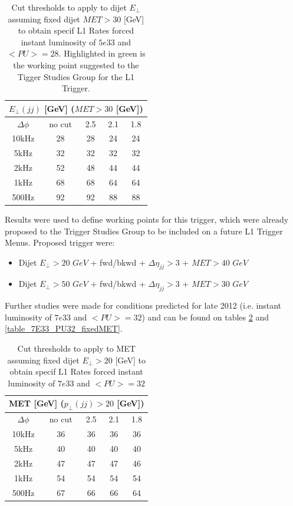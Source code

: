 \documentclass[%
 reprint,
 amsmath,
 amssymb,
 aps,
 pra,
 showkeys
]{revtex4-1}
\begin{document}
\begin{table} 
\begin{tabular}{|c||c|c|c|c|}
\hline
\multicolumn{5}{|c|}{$E_\bot(jj)$ [GeV] ($MET>30$ [GeV])} \\
\hline
$\Delta\phi$ & no cut & 2.5 & 2.1 & 1.8 \\
\hline
10kHz        &     28 &  28 &  24 &  24 \\
5kHz         &     32 &  32 &  32 &  32 \\
\cellcolor{green} 2kHz         &\cellcolor{green}      52 &  48 &  44 &  44 \\
1kHz         &     68 &  68 &  64 &  64 \\
500Hz        &     92 &  92 &  88 &  88 \\
\hline
\end{tabular}
\caption{Cut thresholds to apply to dijet $E_\bot$ assuming fixed dijet $MET>30$ [GeV] to obtain specif L1 Rates forced
instant luminosity of $5e33$ and $<PU>=28$. Highlighted in green is the working point suggested to the Tigger 
Studies Group for the L1 Trigger.}
\label{table_5E33_PU28_fixedMET}
\end{table}

Results were used to define working points for this trigger, which were already proposed to the Trigger Studies Group
to be included on a future L1 Trigger Menus. Proposed trigger were:
\begin{itemize}
  \item Dijet $E_\bot>20$ $GeV$ + fwd/bkwd + $\Delta\eta_{jj}>3$ + $MET>40$ $GeV$
  \item Dijet $E_\bot>50$ $GeV$ + fwd/bkwd + $\Delta\eta_{jj}>3$ + $MET>30$ $GeV$
\end{itemize}

Further studies were made for conditions predicted for late 2012 (i.e. instant luminosity of $7e33$ and $<PU>=32$)
and can be found on tables \ref{table_7E33_PU32_fixedDijet} and \ref{table_7E33_PU32_fixedMET}.

\begin{table} 
\begin{tabular}{|c||c|c|c|c|}
\hline
\multicolumn{5}{|c|}{MET [GeV] ($p_\bot(jj)>20$ [GeV])} \\
\hline
$\Delta\phi$ & no cut & 2.5 & 2.1 & 1.8 \\
\hline
10kHz        &     36 &  36 &  36 &  36 \\
5kHz         &     40 &  40 &  40 &  40 \\
2kHz         &     47 &  47 &  47 &  46 \\
1kHz         &     54 &  54 &  54 &  54 \\
500Hz        &     67 &  66 &  66 &  64 \\
\hline
\end{tabular}
\caption{Cut thresholds to apply to MET assuming fixed dijet $E_\bot>20$ [GeV] to obtain specif L1 Rates forced
instant luminosity of $7e33$ and $<PU>=32$}
\label{table_7E33_PU32_fixedDijet}
\end{table}
\end{document}
